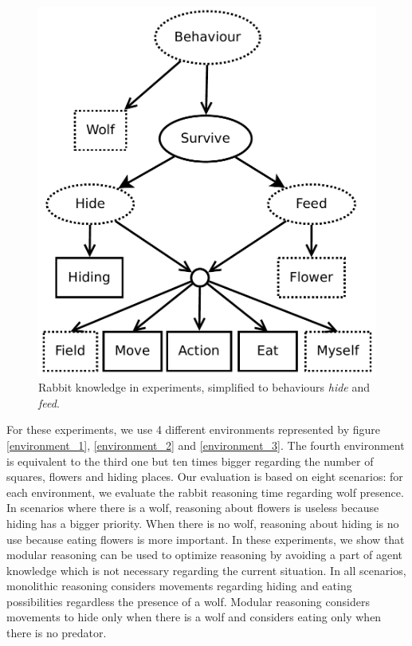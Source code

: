 \documentclass{aamas2012}
\begin{document}
	\begin{figure}
		\centering
		\includegraphics[keepaspectratio=true, scale=0.4]{modular_knowledge_experiment.pdf}
		\caption
		{
			\label{modular_knowledge_experiment}
			Rabbit knowledge in experiments, simplified to behaviours \emph{hide} and \emph{feed}.
		}
	\end{figure}
	
	For these experiments, we use 4 different environments represented by figure \ref{environment_1}, \ref{environment_2} and \ref{environment_3}.
	The fourth environment is equivalent to the third one but ten times bigger regarding the number of squares, flowers and hiding places.
	Our evaluation is based on eight scenarios: for each environment, we evaluate the rabbit reasoning time regarding wolf presence.
	In scenarios where there is a wolf, reasoning about flowers is useless because hiding has a bigger priority.
	When there is no wolf, reasoning about hiding is no use because eating flowers is more important.
	In these experiments, we show that modular reasoning can be used to optimize reasoning by avoiding a part of agent knowledge which 
	is not necessary regarding the current situation.
	In all scenarios, monolithic reasoning considers movements regarding hiding and eating possibilities regardless the presence of a wolf.
	Modular reasoning considers movements to hide only when there is a wolf and considers eating only when there is no predator.
	
\end{document}
